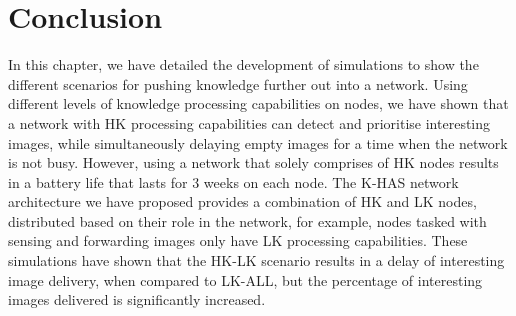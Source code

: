 


\section{Conclusion}
	
In this chapter, we have detailed the development of simulations to show the different scenarios for pushing knowledge further out into a network. Using different levels of knowledge processing capabilities on nodes, we have shown that a network with HK processing capabilities can detect and prioritise interesting images, while simultaneously delaying empty images for a time when the network is not busy. However, using a network that solely comprises of HK nodes results in a battery life that lasts for 3 weeks on each node. The K-HAS network architecture we have proposed provides a combination of HK and LK nodes, distributed based on their role in the network, for example, nodes tasked with sensing and forwarding images only have LK processing capabilities. These simulations have shown that the HK-LK scenario results in a delay of interesting image delivery, when compared to LK-ALL, but the percentage of interesting images delivered is significantly increased.

